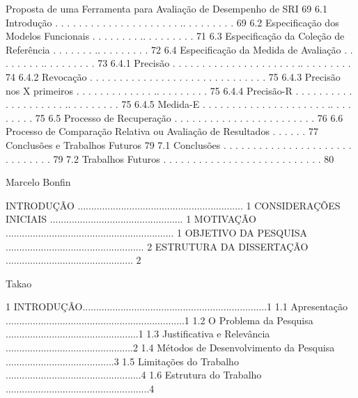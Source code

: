 Proposta de uma Ferramenta para Avaliação de Desempenho de SRI 69
6.1 Introdução . . . . . . . . . . . . . . . . . . . . . .. . . . . . . . . 69
6.2 Especificação dos Modelos Funcionais . . . . . . . . .. . . . . . . . . 71
6.3 Especificação da Coleção de Referência . . . . . . . .. . . . . . . . . 72
6.4 Especificação da Medida de Avaliação . . . . . . . . .. . . . . . . . . 73
6.4.1 Precisão . . . . . . . . . . . . . . . . . . . . . .. . . . . . . . . 74
6.4.2 Revocação . . . . . . . . . . . . . . . . . . . . . . . . . . . . . . 75
6.4.3 Precisão nos X primeiros . . . . . . . . . . . . . .. . . . . . . . . 75
6.4.4 Precisão-R . . . . . . . . . . . . . . . . . . . . .. . . . . . . . . 75
6.4.5 Medida-E . . . . . . . . . . . . . . . . . . . . . .. . . . . . . . . 75
6.5 Processo de Recuperação . . . . . . . . . . . . . . . . . . . . . . . . 76
6.6 Processo de Comparação Relativa ou Avaliação de Resultados  . . . . . . 77
Conclusões e Trabalhos Futuros 79
7.1 Conclusões . . . . . . . . . . . . . . . . . . . . . . . .  . . . . . . 79
7.2 Trabalhos Futuros . . . . . . . . . . . . . . . . . . . . . . . . . . . 80




Marcelo Bonfin

INTRODUÇÃO ............................................................. 1
CONSIDERAÇÕES INICIAIS ................................................. 1
MOTIVAÇÃO .............................................................. 1
OBJETIVO DA PESQUISA ................................................... 2
ESTRUTURA DA DISSERTAÇÃO ............................................... 2





Takao

1 INTRODUÇÃO....................................................................1
1.1 Apresentação ..................................................................1
1.2 O Problema da Pesquisa .................................................1
1.3 Justificativa e Relevância ...............................................2
1.4 Métodos de Desenvolvimento da Pesquisa ........................................3
1.5 Limitações do Trabalho ..................................................4
1.6 Estrutura do Trabalho .....................................................4

